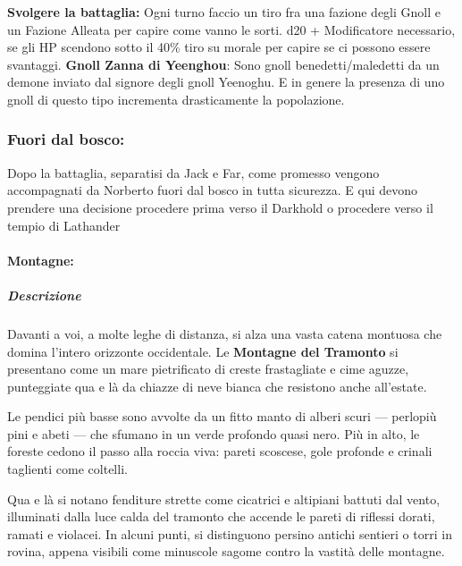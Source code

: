 \documentclass{article}
\begin{document}
\textbf{Svolgere la battaglia:} Ogni turno faccio un tiro fra una fazione degli Gnoll e un Fazione Alleata per capire come vanno le sorti. d20 + Modificatore necessario, se gli HP scendono sotto il 40\% tiro su morale per capire se ci possono essere svantaggi. 
\textbf{Gnoll Zanna di Yeenghou}: Sono gnoll benedetti/maledetti da un demone inviato dal signore degli gnoll Yeenoghu. E in genere la presenza di uno gnoll di questo tipo incrementa drasticamente la popolazione. 
        
\subsubsection{Fuori dal bosco: }
    Dopo la battaglia, separatisi da Jack e Far, come promesso vengono accompagnati da Norberto fuori dal bosco in tutta sicurezza. E qui devono prendere una decisione procedere prima verso il Darkhold o procedere verso il tempio di Lathander
    
    
    \paragraph{Montagne:}
            \subparagraph{Descrizione} Davanti a voi, a molte leghe di distanza, si alza una vasta catena montuosa che domina l’intero orizzonte occidentale. Le \textbf{Montagne del Tramonto} si presentano come un mare pietrificato di creste frastagliate e cime aguzze, punteggiate qua e là da chiazze di neve bianca che resistono anche all’estate.

Le pendici più basse sono avvolte da un fitto manto di alberi scuri --- perlopiù pini e abeti --- che sfumano in un verde profondo quasi nero. Più in alto, le foreste cedono il passo alla roccia viva: pareti scoscese, gole profonde e crinali taglienti come coltelli.

Qua e là si notano fenditure strette come cicatrici e altipiani battuti dal vento, illuminati dalla luce calda del tramonto che accende le pareti di riflessi dorati, ramati e violacei. In alcuni punti, si distinguono persino antichi sentieri o torri in rovina, appena visibili come minuscole sagome contro la vastità delle montagne.
\end{document}
